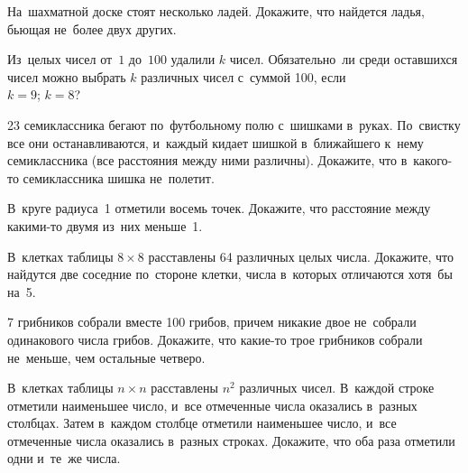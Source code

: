 


\begin{problems}


\item
На~шахматной доске стоят несколько ладей.
Докажите, что найдется ладья, бьющая не~более двух других.

\item
Из~целых чисел от~$1$ до~$100$ удалили $k$ чисел.
Обязательно~ли среди оставшихся чисел можно выбрать $k$ различных чисел
с~суммой 100, если
\\
\subproblem $k = 9$;
\qquad
\subproblem $k = 8$?

\item
23 семиклассника бегают по~футбольному полю с~шишками в~руках.
По~свистку все они останавливаются, и~каждый кидает шишкой в~ближайшего к~нему
семиклассника (все расстояния между ними различны).
Докажите, что в~какого-то семиклассника шишка не~полетит.

\item
В~круге радиуса~1 отметили восемь точек.
Докажите, что расстояние между какими-то двумя из~них меньше~1.

\item
В~клетках таблицы $8 \times 8$ расставлены 64 различных целых числа.
Докажите, что найдутся две соседние по~стороне клетки, числа в~которых
отличаются хотя~бы на~5.

\item
7 грибников собрали вместе 100 грибов, причем никакие двое не~собрали
одинакового числа грибов.
Докажите, что какие-то трое грибников собрали не~меньше, чем остальные четверо.

\item
В~клетках таблицы $n \times n$ расставлены $n^2$ различных чисел.
В~каждой строке отметили наименьшее число, и~все отмеченные числа оказались
в~разных столбцах.
Затем в~каждом столбце отметили наименьшее число, и~все отмеченные числа
оказались в~разных строках.
Докажите, что оба раза отметили одни и~те~же числа.


\end{problems}
